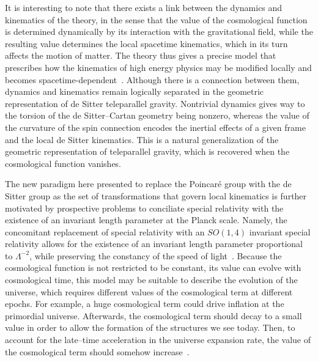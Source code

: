 \documentclass[%
5p,
times,
sort&compress
]{elsarticle}
\begin{document}
It is interesting to note that there exists a link between the 
dynamics and kinematics of the theory, in the sense that the 
value of the cosmological function is determined dynamically by 
its interaction with the gravitational field, while the resulting 
value determines the local spacetime kinematics, which in its 
turn affects the motion of matter. The theory thus gives 
a precise model that prescribes how the kinematics of high energy 
physics may be modified locally and becomes 
spacetime-dependent~\cite{Mansouri:2002cg}. Although there is 
a connection between them, dynamics and kinematics remain 
logically separated in the geometric representation of de Sitter 
teleparallel gravity. Nontrivial dynamics gives way to the 
torsion of the de Sitter--Cartan geometry being nonzero, whereas 
the value of the curvature of the spin connection encodes the 
inertial effects of a given frame and the local de Sitter 
kinematics. This is a natural generalization of the geometric 
representation of teleparallel gravity, which is recovered when 
the cosmological function vanishes.

The new paradigm here presented to replace the Poincar\'e group 
with the de Sitter group as the set of transformations that 
govern local kinematics is further motivated by prospective 
problems to conciliate special relativity with the existence of 
an invariant length parameter at the Planck scale. Namely, the 
concomitant replacement of special relativity with an $SO(1,4)$ 
invariant special relativity allows for the existence of an 
invariant length parameter proportional to $\Lambda^{-2}$, while 
preserving the constancy of the speed of 
light~\cite{Aldrovandi:2006vr}.  Because the cosmological 
function is not restricted to be constant, its value can evolve 
with cosmological time, this model may be suitable to describe 
the evolution of the universe, which requires different values of 
the cosmological term at different epochs. For example, a huge 
cosmological term could drive inflation at the primordial 
universe. Afterwards, the cosmological term should decay to 
a small value in order to allow the formation of the structures 
we see today. Then, to account for the late--time acceleration in 
the universe expansion rate, the value of the cosmological term 
should somehow increase~\cite{Araujo:2015oqa}.
\end{document}
